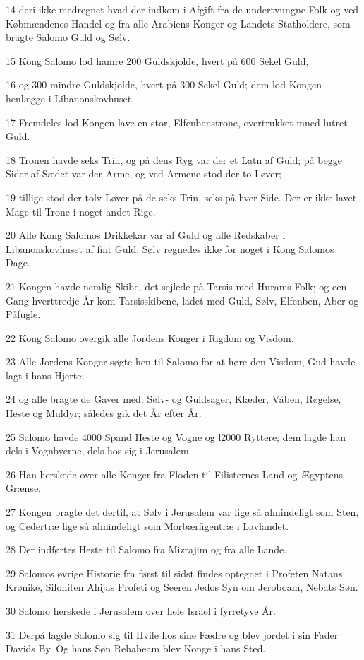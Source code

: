 \par 14 deri ikke medregnet hvad der indkom i Afgift fra de undertvungne Folk og ved Købmændenes Handel og fra alle Arabiens Konger og Landets Statholdere, som bragte Salomo Guld og Sølv.
\par 15 Kong Salomo lod hamre 200 Guldskjolde, hvert på 600 Sekel Guld,
\par 16 og 300 mindre Guldskjolde, hvert på 300 Sekel Guld; dem lod Kongen henlægge i Libanonskovhuset.
\par 17 Fremdeles lod Kongen lave en stor, Elfenbenstrone, overtrukket mned lutret Guld.
\par 18 Tronen havde seks Trin, og på dens Ryg var der et Latn af Guld; på begge Sider af Sædet var der Arme, og ved Armene stod der to Løver;
\par 19 tillige stod der tolv Løver på de seks Trin, seks på hver Side. Der er ikke lavet Mage til Trone i noget andet Rige.
\par 20 Alle Kong Salomos Drikkekar var af Guld og alle Redskaber i Libanonskovhuset af fint Guld; Sølv regnedes ikke for noget i Kong Salomos Dage.
\par 21 Kongen havde nemlig Skibe, det sejlede på Tarsis med Hurams Folk; og een Gang hverttredje År kom Tarsisskibene, ladet med Guld, Sølv, Elfenben, Aber og Påfugle.
\par 22 Kong Salomo overgik alle Jordens Konger i Rigdom og Visdom.
\par 23 Alle Jordens Konger søgte hen til Salomo for at høre den Visdom, Gud havde lagt i hans Hjerte;
\par 24 og alle bragte de Gaver med: Sølv- og Guldsager, Klæder, Våben, Røgelse, Heste og Muldyr; således gik det År efter År.
\par 25 Salomo havde 4000 Spand Heste og Vogne og l2000 Ryttere; dem lagde han dels i Vognbyerne, dels hos sig i Jerusalem.
\par 26 Han herskede over alle Konger fra Floden til Filisternes Land og Ægyptens Grænse.
\par 27 Kongen bragte det dertil, at Sølv i Jerusalem var lige så almindeligt som Sten, og Cedertræ lige så almindeligt som Morbærfigentræ i Lavlandet.
\par 28 Der indførtes Heste til Salomo fra Mizrajim og fra alle Lande.
\par 29 Salomos øvrige Historie fra først til sidst findes optegnet i Profeten Natans Krønike, Siloniten Ahijas Profeti og Seeren Jedos Syn om Jeroboam, Nebats Søn.
\par 30 Salomo herskede i Jerusalem over hele Israel i fyrretyve År.
\par 31 Derpå lagde Salomo sig til Hvile hos sine Fædre og blev jordet i sin Fader Davids By. Og hans Søn Rehabeam blev Konge i hans Sted.

